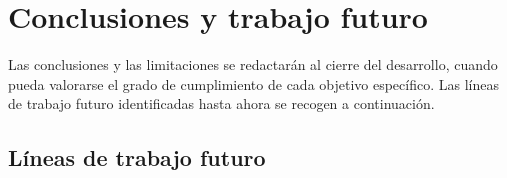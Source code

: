 \chapter{Conclusiones y trabajo futuro}
\label{cap:conclusiones}

Las conclusiones y las limitaciones se redactarán al cierre del desarrollo, cuando pueda
valorarse el grado de cumplimiento de cada objetivo específico. Las líneas de trabajo futuro
identificadas hasta ahora se recogen a continuación.


\section{Líneas de trabajo futuro}

